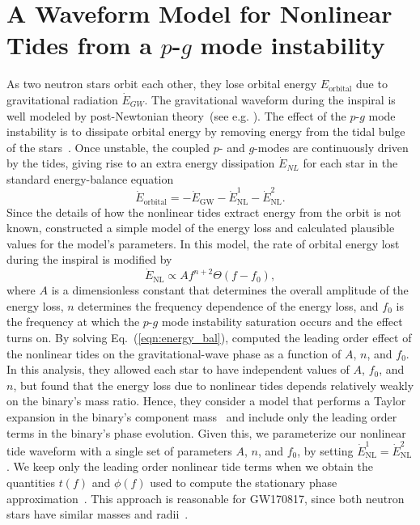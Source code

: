 \section{A Waveform Model for Nonlinear Tides from a $p$-$g$ mode instability}
\label{sec:waveform}

As two neutron stars orbit each other, they lose orbital energy $E_\mathrm{orbital}$ due to gravitational radiation $\dot{E}_{GW}$. The gravitational waveform during the inspiral is well modeled by post-Newtonian theory~(see e.g. \cite{Blanchet:2013haa}).  The effect of the $p$-$g$ mode instability is to dissipate orbital energy by removing energy from the tidal bulge of the stars~\citep{Weinberg:2013pbi,Weinberg:2015pxa,Essick:2016tkn}. Once unstable, the coupled $p$- and $g$-modes are continuously driven by the tides, giving rise to an extra energy dissipation $\dot{E}_{NL}$ for each star in the standard energy-balance equation~\citep{Peters:1963ux} 
\begin{equation}
\dot{E}_\mathrm{orbital} = -\dot{E}_\mathrm{GW} - \dot{E}^1_\mathrm{NL} - \dot{E}^2_\mathrm{NL}.
\label{eqn:energy_bal}
\end{equation}
Since the details of how the nonlinear tides extract energy from the orbit is not known, \cite{Essick:2016tkn} constructed a simple model of the energy loss and calculated plausible values for the model's parameters. In this model, the rate of orbital energy lost during the inspiral is modified by 
\begin{equation}\label{eqn:energy_nl}
\dot{E}_\mathrm{NL} \propto A f^{n+2} \Theta (f - f_0),
\end{equation}
where $A$ is a dimensionless constant that determines the overall amplitude of the energy loss, $n$ determines the frequency dependence of the energy loss, and $f_0$ is the frequency at which the $p$-$g$ mode instability saturation occurs and the effect turns on. By solving Eq.~(\ref{eqn:energy_bal}), \cite{Essick:2016tkn} computed the leading order effect of the nonlinear tides on the gravitational-wave phase as a function of $A$, $n$, and $f_0$. In this analysis, they allowed each star to have independent values of $A$, $f_0$, and $n$, but found that the energy loss due to nonlinear tides depends relatively weakly on the binary's mass ratio. Hence, they consider a model that performs a Taylor expansion in the binary's component mass~\citep{DelPozzo:2013ala} and include only the leading order terms in the binary's phase evolution. Given this, we parameterize our nonlinear tide waveform with a single set of parameters $A$, $n$, and $f_0$, by setting $\dot{E}^1_\mathrm{NL} = \dot{E}^2_\mathrm{NL}$. We  keep only the leading order nonlinear tide terms when we obtain the quantities $t(f)$ and $\phi(f)$ used to compute the stationary phase approximation~\citep{Sathyaprakash:1991mt,Droz:1999qx,Lindblom:2008cm}. This approach is reasonable for GW170817, since both neutron stars have similar masses and radii~\citep{de2018tidal}.

